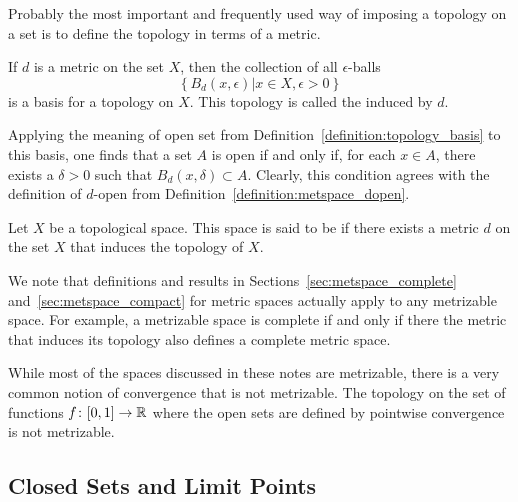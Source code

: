 Probably the most important and frequently used way of imposing a topology on a set is to define the topology in terms of a metric.
\begin{example}
If $d$ is a metric on the set $X$, then the collection of all $\epsilon$-balls
\begin{equation*}
\left\{ B_d (x, \epsilon) |  x \in X, \epsilon > 0 \right\}
\end{equation*}
is a basis for a topology on $X$.
This topology is called the  induced by $d$.

Applying the meaning of open set from Definition~\ref{definition:topology_basis} to this basis, one finds that a set $A$ is open if and only if, for each $x \in A$, there exists a $\delta > 0$ such that $B_d (x, \delta) \subset A$.
Clearly, this condition agrees with the definition of $d$-open from Definition~\ref{definition:metspace_dopen}.
\end{example}

\begin{definition}
Let $X$ be a topological space.
This space is said to be  if there exists a metric $d$ on the set $X$ that induces the topology of $X$.
\end{definition}

We note that definitions and results in Sections~\ref{sec:metspace_complete} and~\ref{sec:metspace_compact} for metric spaces actually apply to any metrizable space.
For example, a metrizable space is complete if and only if there the metric that induces its topology also defines a complete metric space.

\begin{example}
While most of the spaces discussed in these notes are metrizable, there is a very common notion of convergence that is not metrizable.
The topology on the set of functions $f \colon [0,1]\rightarrow \mathbb{R}$ where the open sets are defined by pointwise convergence is not metrizable.
\end{example}


\subsection{Closed Sets and Limit Points}

